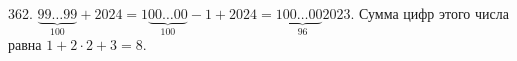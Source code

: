362. $\underbrace{99\ldots99}_{100}+2024=1\underbrace{00\ldots00}_{100}-1+2024=1\underbrace{00\ldots00}_{96}2023.$ Сумма цифр этого числа равна $1+2\cdot2+3=8.$\\
